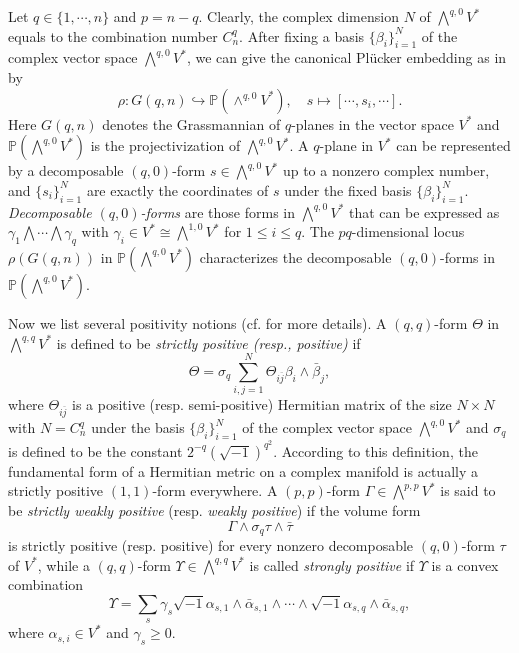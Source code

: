 \documentclass[12pt]{amsart}
\numberwithin{equation}{section}
\theoremstyle{definition}
\theoremstyle{definition}
\theoremstyle{definition}
\renewcommand{\1}{\mathsf{1}}
\renewcommand{\>}{\rightarrow}
\def\b{\bar}
\theoremstyle{plain} %
\theoremstyle{plain} %
\theoremstyle{plain} %
\begin{document}
Let $q\in \{1, \cdots, n\}$ and $p=n-q$. Clearly, the complex dimension
	$N$ of $\bigwedge^{q,0}V^*$ equals to the combination number $C^{q}_n$. After fixing a basis $\{
	\beta_i \}_{i=1}^N$ of the complex vector space $\bigwedge^{q,0}V^*$, we can give
	the canonical Pl\"ucker embedding as in \cite[p.   209]{GH78}
	by
\[
\rho: G(q,n) \hookrightarrow \mathbb{P}(\wedge^{q,0} V^*), \quad s \mapsto [\cdots, s_i, \cdots].
\]
	Here $G(q,n)$ denotes the Grassmannian of $q$-planes in the vector
	space $V^*$ and $\mathbb{P}(\bigwedge^{q,0}V^*)$ is the
	projectivization of $\bigwedge^{q,0}V^*$. %
	A $q$-plane in $V^*$ can
	be represented by a decomposable $(q,0)$-form $s \in
	\bigwedge^{q,0}V^*$ up to a nonzero complex number, and
	$\{s_i\}_{i=1}^N$ are exactly the coordinates of $s$
	under the fixed basis $\{ \beta_i \}_{i=1}^N$.  \textit{Decomposable
		$(q,0)$-forms} are those forms in $ \bigwedge^{q,0}V^*$ that can be
	expressed as $\gamma_1 \bigwedge \cdots \bigwedge \gamma_q$ with
	$\gamma_i \in V^* \cong \bigwedge^{1,0}V^*$ for $1 \leq i \leq q$.
	The $pq$-dimensional locus $\rho(G(q,n))$ in
	$\mathbb{P}(\bigwedge^{q,0}V^*)$ characterizes the
	decomposable $(q,0)$-forms in $\mathbb{P}(\bigwedge^{q,0}V^*)$.
	
	Now we list several positivity notions (cf. \cite{HK74,Hv77,Dm12} for more details). A $(q,q)$-form $\Theta$ in
	$\bigwedge^{q,q}V^*$ is defined to be  \textit{strictly positive (resp., positive)} if
	\[ \Theta =\sigma_{q}\sum_{i,j=1}^N \Theta_{i\overline{ j}} \beta_i \wedge \b\beta_j,\]
	where $\Theta_{i\overline j}$ is a positive (resp. semi-positive) Hermitian matrix of the size $N \times N$ with $N=C_{n}^q$ under the
	basis $\{\beta_i \}_{i=1}^N$ of the complex vector space $\bigwedge^{q,0}V^*$ and $\sigma_{q}$ is defined to be the constant
	$2^{-q}(\sqrt{-1})^{q^2}$.
	According to this definition, the fundamental form of a Hermitian metric on a complex manifold is actually a strictly positive $(1,1)$-form everywhere. A $(p,p)$-form $\Gamma\in \bigwedge^{p,p}V^*$ is said to be  \textit{strictly weakly positive} (resp.\textit{ weakly positive}) if
	the volume form $$\Gamma\wedge\sigma_{q}\tau\wedge\bar{\tau}$$ is
	strictly positive (resp.  positive)  for every nonzero decomposable $(q,0)$-form $\tau$ of $V^*$, while
	a $(q,q)$-form $\Upsilon\in \bigwedge^{q,q}V^*$ is called  \textit {strongly positive} if
	$\Upsilon$ is a convex combination
	$$\Upsilon=\sum_s\gamma_s \sqrt{-1}\alpha_{s,1}\wedge\bar\alpha_{s,1}\wedge\cdots\wedge\sqrt{-1}\alpha_{s,q}\wedge\bar\alpha_{s,q},$$
	where $\alpha_{s,i}\in V^*$ and $\gamma_s\geq 0$.
\end{document}
